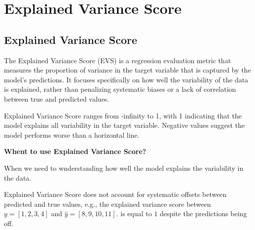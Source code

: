 \section{Explained Variance Score}
\subsection{Explained Variance Score}

The Explained Variance Score (EVS) is a regression evaluation metric that measures the proportion of variance in the target variable that is captured by the model’s predictions.
It focuses specifically on how well the variability of the data is explained, rather than penalizing systematic biases or a lack of correlation between true and predicted values.

\begin{center}
\end{center}

Explained Variance Score ranges from -infinity to 1, with 1 indicating that the model explains all variability in the target variable. Negative values suggest the model performs worse
than a horizontal line.

\textbf{Whent to use Explained Variance Score?}

When we need to wnderstanding how well the model explains the variability in the data.

{
    \item Explained Variance Score does not account for systematic offsets between predicted and true values, e.g., the explained variance score between 
    \( y=[1, 2, 3, 4] \) and \( \hat{y}=[8, 9, 10, 11] \). is equal to $1$ despite the predictions being off.
}
